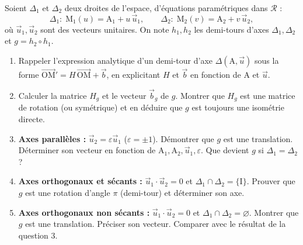\documentclass[11pt]{article}
\begin{document}
\begin{exercice}
Soient $\Delta_1$ et $\Delta_2$ deux droites de l'espace, d'équations paramétriques dans $\mathcal{R}$ :
\[
\Delta_1:\; \mathrm{M}_1(u) = \mathrm{A}_1 + u\,\vec{u}_1,\qquad \Delta_2:\; \mathrm{M}_2(v) = \mathrm{A}_2 + v\,\vec{u}_2,
\]
où $\vec{u}_1,\vec{u}_2$ sont des vecteurs unitaires. On note $h_1,h_2$ les demi-tours d'axes $\Delta_1,\Delta_2$ et $g = h_2 \circ h_1$.

\begin{enumerate}
    \item Rappeler l'expression analytique d'un demi-tour d'axe $\Delta(\mathrm{A},\vec{u})$ sous la forme $\overrightarrow{\mathrm{OM}}' = H\,\overrightarrow{\mathrm{OM}} + \vec{b}$, en explicitant $H$ et $\vec{b}$ en fonction de $\mathrm{A}$ et $\vec{u}$.
    \item Calculer la matrice $H_g$ et le vecteur $\vec{b}_g$ de $g$. Montrer que $H_g$ est une matrice de rotation (ou symétrique) et en déduire que $g$ est toujours une isométrie directe.
    \item \textbf{Axes parallèles :} $\vec{u}_2 = \varepsilon \vec{u}_1$ ($\varepsilon = \pm 1$). Démontrer que $g$ est une translation. Déterminer son vecteur en fonction de $\mathrm{A}_1,\mathrm{A}_2,\vec{u}_1,\varepsilon$. Que devient $g$ si $\Delta_1 = \Delta_2$ ?
    \item \textbf{Axes orthogonaux et sécants :} $\vec{u}_1 \cdot \vec{u}_2 = 0$ et $\Delta_1 \cap \Delta_2 = \{\mathrm{I}\}$. Prouver que $g$ est une rotation d'angle $\pi$ (demi-tour) et déterminer son axe.
    \item \textbf{Axes orthogonaux non sécants :} $\vec{u}_1 \cdot \vec{u}_2 = 0$ et $\Delta_1 \cap \Delta_2 = \varnothing$. Montrer que $g$ est une translation. Préciser son vecteur. Comparer avec le résultat de la question 3.
\end{enumerate}
\end{exercice}
\end{document}
